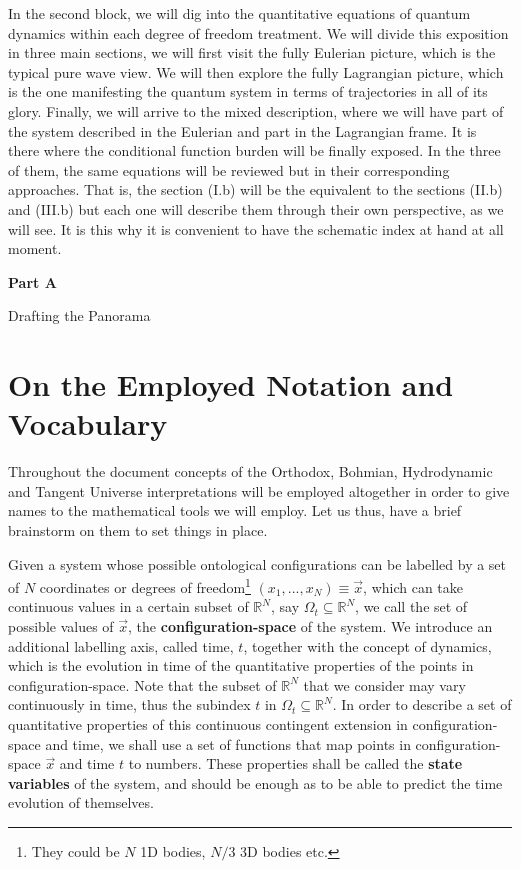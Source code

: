 \documentclass[11pt, a4paper]{article} %
\newcommand{\R}{\mathbb{R}} %
\newenvironment{kapituloBerria}[1][]
  {\clearpage           %
   \thispagestyle{empty}%
   \vspace*{\stretch{2}}%
   \raggedleft          %
   {\textbf{{\fontsize{60}{40}\selectfont \hspace{+9.5cm}#1\newline \newline}}}
   \bf
   \fontsize{30}{20}\selectfont
  }
  {\par %
   \vspace{\stretch{3}} %
   \clearpage           %
  }
\begin{document}
In the second block, we will dig into the quantitative equations of quantum dynamics within each degree of freedom treatment. We will divide this exposition in three main sections, we will first visit the fully Eulerian picture, which is the typical pure wave view. We will then explore the fully Lagrangian picture, which is the one manifesting the quantum system in terms of trajectories in all of its glory. Finally, we will arrive to the mixed description, where we will have part of the system described in the Eulerian and part in the Lagrangian frame. It is there where the conditional function burden will be finally exposed. In the three of them, the same equations will be reviewed but in their corresponding approaches. That is, the section (I.b) will be the equivalent to the sections (II.b) and (III.b) but each one will describe them through their own perspective, as we will see. It is this why it is convenient to have the schematic index at hand at all moment.

\newpage

\begin{kapituloBerria}[Part A]
Drafting the Panorama
\end{kapituloBerria}
\newpage
\null
\clearpage

\pagestyle{fancy}

\section*{On the Employed Notation and Vocabulary}

Throughout the document concepts of the Orthodox, Bohmian, Hydrodynamic and Tangent Universe interpretations will be employed altogether in order to give names to the mathematical tools we will employ. Let us thus, have a brief brainstorm on them to set things in place.

Given a system whose possible ontological configurations can be labelled by a set of $N$ coordinates or degrees of freedom\footnote{They could be $N$ 1D bodies, $N/3$ 3D bodies etc.} $(x_1, ...,x_N)\equiv \vec{x}$, which can take continuous values in a certain subset of $\R^N$, say $\Omega_t\subseteq \R^N$, we call the set of possible values of $\vec{x}$, the {\bf configuration-space} of the system. We introduce an additional labelling axis, called time, $t$, together with the concept of dynamics, which is the evolution in time of the quantitative properties of the points in configuration-space. Note that the subset of $\R^N$ that we consider may vary continuously in time, thus the subindex $t$ in $\Omega_t\subseteq \R^N$. In order to describe a set of quantitative properties of this continuous contingent extension in configuration-space and time, we shall use a set of functions that map points in configuration-space $\vec{x}$ and time $t$ to numbers. These properties shall be called the {\bf state variables} of the system, and should be enough as to be able to predict the time evolution of themselves. 
\end{document}
